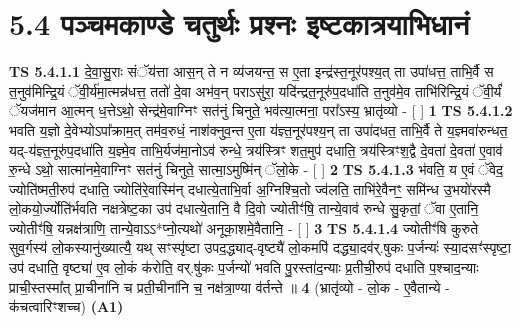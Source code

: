 \documentclass[17pt]{extarticle}
\begin{document}
     \section*{ 5.4      पञ्चमकाण्डे चतुर्थः प्रश्नः इष्टकात्रयाभिधानं }
                                        \textbf{ TS 5.4.1.1} \newline
                  दे॒वा॒सु॒राः संॅय॑त्ता आस॒न् ते न व्य॑जयन्त॒ स ए॒ता इन्द्र॑स्त॒नूर॑पश्य॒त् ता उपा॑धत्त॒ ताभि॒र्वै स त॒नुव॑मिन्द्रि॒यं ॅवी॒र्य॑मा॒त्मन्न॑धत्त॒ ततो॑ दे॒वा अभ॑व॒न् पराऽसु॑रा॒ यदि॑न्द्रत॒नूरु॑प॒दधा॑ति त॒नुव॑मे॒व ताभि॑रिन्द्रि॒यं ॅवी॒र्यं॑ ॅयज॑मान आ॒त्मन् ध॒त्तेऽथो॒ सेन्द्र॑मे॒वाग्निꣳ सत॑नुं चिनुते॒ भव॑त्या॒त्मना॒ परा᳚ऽस्य॒ भ्रातृ॑व्यो - [  ] \textbf{  1} \newline
                  \newline
                                \textbf{ TS 5.4.1.2} \newline
                  भवति य॒ज्ञो दे॒वेभ्योऽपा᳚क्राम॒त् तम॑व॒रुधं॒ नाश॑क्नुव॒न्त ए॒ता य॑ज्ञ्त॒नूर॑पश्य॒न् ता उपा॑दधत॒ ताभि॒र्वै ते य॒ज्ञ्मवा॑रुन्धत॒ यद्-य॑ज्ञ्त॒नूरु॑प॒दधा॑ति य॒ज्ञ्मे॒व ताभि॒र्यज॑मा॒नोऽव॑ रुन्धे॒ त्रय॑स्त्रिꣳ शत॒मुप॑ दधाति॒ त्रय॑स्त्रिꣳश॒द्वै दे॒वता॑ दे॒वता॑ ए॒वाव॑ रु॒न्धे ऽथो॒ सात्मा॑नमे॒वाग्निꣳ सत॑नुं चिनुते॒ सात्मा॒ऽमुष्मि॑न् ॅलो॒के - [  ] \textbf{  2} \newline
                  \newline
                                \textbf{ TS 5.4.1.3} \newline
                  भ॑वति॒ य ए॒वं ॅवेद॒ ज्योति॑ष्मती॒रुप॑ दधाति॒ ज्योति॑रे॒वास्मि॑न् दधात्ये॒ताभि॒र्वा अ॒ग्निश्चि॒तो ज्व॑लति॒ ताभि॑रे॒वैनꣳ॒॒ समि॑न्ध उ॒भयो॑रस्मै लो॒कयो॒र्ज्योति॑र्भवति नक्षत्रेष्ट॒का उप॑ दधात्ये॒तानि॒ वै दि॒वो ज्योतीꣳ॑षि॒ तान्ये॒वाव॑ रुन्धे सु॒कृतां॒ ॅवा ए॒तानि॒ ज्योतीꣳ॑षि॒ यन्नक्ष॑त्राणि॒ तान्ये॒वाऽऽ*प्नो॒त्यथो॑ अनूका॒शमे॒वैतानि॒ - [  ] \textbf{  3} \newline
                  \newline
                                \textbf{ TS 5.4.1.4} \newline
                  ज्योतीꣳ॑षि कुरुते सुव॒र्गस्य॑ लो॒कस्यानु॑ख्यात्यै॒ यथ् सꣳस्पृ॑ष्टा उपद॒द्ध्याद्-वृष्ट्यै॑ लो॒कमपि॑ दद्ध्या॒दव॑र्.षुकः प॒र्जन्यः॑ स्या॒दसꣳ॑स्पृष्टा॒ उप॑ दधाति॒ वृष्ट्या॑ ए॒व लो॒कं क॑रोति॒ वर्.षु॑कः प॒र्जन्यो॑ भवति पु॒रस्ता॑द॒न्याः प्र॒तीची॒रुप॑ दधाति प॒श्चाद॒न्याः प्राची॒स्तस्मा᳚त् प्रा॒चीना॑नि च प्रती॒चीना॑नि च॒ नक्ष॑त्रा॒ण्या व॑र्तन्ते ॥ \textbf{  4} \newline
                  \newline
                      (भ्रातृ॑व्यो - लो॒क - ए॒वैतान्ये - क॑चत्वारिꣳशच्च)  \textbf{(A1)} \newline \newline
\end{document}
